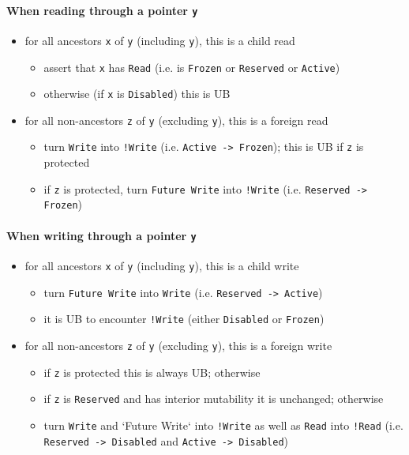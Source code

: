 \documentclass[a4paper,11pt]{article}
\theoremstyle{plain}
\theoremstyle{definition}
\theoremstyle{remark}
\newcommand{\tcode}[1]{\texttt{#1}}
\newcommand{\tperm}[1]{\texttt{#1}}
\begin{document}
\paragraph*{When reading through a pointer \tcode{y}}
\begin{itemize}
    \item for all ancestors \tcode{x} of \tcode{y} (including \tcode{y}), this is a child read
        \begin{itemize}
            \item assert that \tcode{x} has \tperm{Read} (i.e. is \tperm{Frozen} or \tperm{Reserved} or \tperm{Active})
            \item otherwise (if \tcode{x} is \tperm{Disabled}) this is UB
        \end{itemize}
    \item for all non-ancestors \tcode{z} of \tcode{y} (excluding \tcode{y}), this is a foreign read
        \begin{itemize}
            \item turn \tperm{Write} into \tperm{!Write} (i.e. \tperm{Active -> Frozen}); this is UB if \tcode{z} is protected
            \item if \tcode{z} is protected, turn \tperm{Future Write} into \tperm{!Write} (i.e. \tperm{Reserved -> Frozen})
        \end{itemize}
\end{itemize}

\paragraph*{When writing through a pointer \tcode{y}}
\begin{itemize}
    \item for all ancestors \tcode{x} of \tcode{y} (including \texttt{y}), this is a child write
        \begin{itemize}
            \item turn \tperm{Future Write} into \tperm{Write} (i.e. \tperm{Reserved -> Active})
            \item it is UB to encounter \tperm{!Write} (either \tperm{Disabled} or \tperm{Frozen})
        \end{itemize}
    \item for all non-ancestors \tcode{z} of \tcode{y} (excluding \tcode{y}), this is a foreign write
        \begin{itemize}
            \item if \tcode{z} is protected this is always UB; otherwise
            \item if \tcode{z} is \tperm{Reserved} and has interior mutability it is unchanged; otherwise
            \item turn \tperm{Write} and `Future Write` into \tperm{!Write} as well as \tperm{Read} into \tperm{!Read}
                (i.e. \tperm{Reserved -> Disabled} and \tperm{Active -> Disabled})
        \end{itemize}
\end{itemize}
\end{document}
